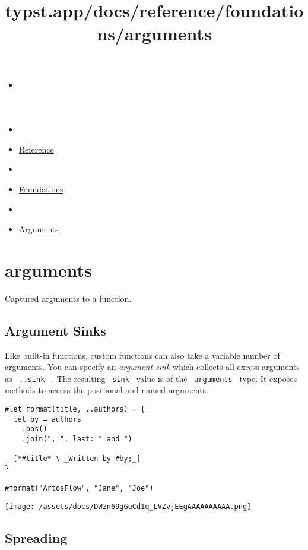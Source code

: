 \title{typst.app/docs/reference/foundations/arguments}

\begin{itemize}
\tightlist
\item
  \href{/docs}{}
\item
  
\item
  \href{/docs/reference/}{Reference}
\item
  
\item
  \href{/docs/reference/foundations/}{Foundations}
\item
  
\item
  \href{/docs/reference/foundations/arguments/}{Arguments}
\end{itemize}

\section{\texorpdfstring{{ arguments }}{ arguments }}\label{summary}

Captured arguments to a function.

\subsection{Argument Sinks}\label{argument-sinks}

Like built-in functions, custom functions can also take a variable
number of arguments. You can specify an \emph{argument sink} which
collects all excess arguments as \texttt{\ ..sink\ } . The resulting
\texttt{\ sink\ } value is of the \texttt{\ arguments\ } type. It
exposes methods to access the positional and named arguments.

\begin{verbatim}
#let format(title, ..authors) = {
  let by = authors
    .pos()
    .join(", ", last: " and ")

  [*#title* \ _Written by #by;_]
}

#format("ArtosFlow", "Jane", "Joe")
\end{verbatim}

\texttt{[image: /assets/docs/DWzn69gGuCd1q\_LVZvjEEgAAAAAAAAAA.png]}

\subsection{Spreading}\label{spreading}

